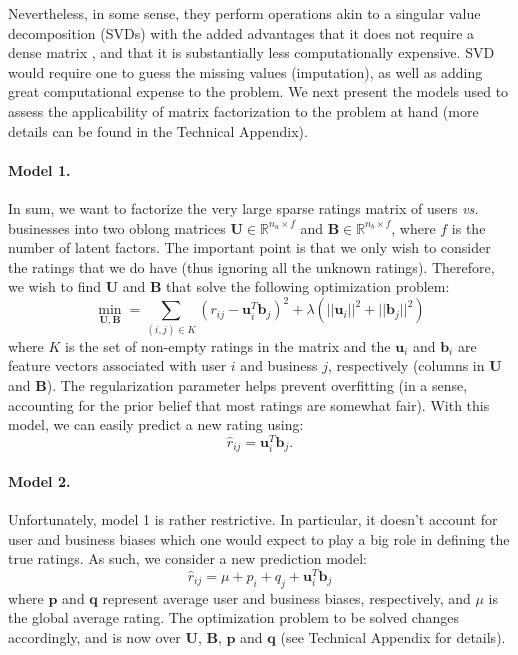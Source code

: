 \documentclass[12pt]{article}
\newcommand{\mbf}[1]{\mathbf{#1}}
\begin{document}
Nevertheless, in some sense, they perform operations akin to a singular value decomposition (SVDs) with the added advantages that it does not require a dense matrix , and that it is substantially less computationally expensive. SVD would require one to guess the missing values (imputation), as well as adding great computational expense to the problem. We next present the models used to assess the applicability of matrix factorization to the problem at hand (more details can be found in the Technical Appendix).

\paragraph{Model 1.} In sum, we want to factorize the very large sparse ratings matrix of users \emph{vs.} businesses into two oblong matrices $\mbf U\in\mathbb{R}^{n_u\times f}$ and $\mbf B\in\mathbb{R}^{n_b\times f}$, where $f$ is the number of latent factors. The important point is that we only wish to consider the ratings that we do have (thus ignoring all the unknown ratings). Therefore, we wish to find $\mbf U$ and $\mbf B$ that solve the following optimization problem:
\begin{equation}
\min_{\mbf U,\mbf B} = \sum_{(i,j)\in K} (r_{ij}-\mbf u_i^T\mbf b_j)^2+\lambda\left(||\mbf u_i||^2+||\mbf b_j||^2\right)
\end{equation}
where $K$ is the set of non-empty ratings in the matrix and the $\mbf u_i$ and $\mbf b_i$ are feature vectors associated with user $i$ and business $j$, respectively (columns in $\mbf U$ and $\mbf B$). The regularization parameter helps prevent overfitting (in a sense, accounting for the prior belief that most ratings are somewhat fair). With this model, we can easily predict a new rating using:
\begin{equation}
\hat r_{ij} = \mbf u_i^T\mbf b_j.
\end{equation}

\paragraph{Model 2.} Unfortunately, model 1 is rather restrictive. In particular, it doesn't account for user and business biases which one would expect to play a big role in defining the true ratings. As such, we consider a new prediction model:
\begin{equation}
\hat r_{ij} = \mu + p_i + q_j + \mbf u_i^T\mbf b_j
\end{equation}
where $\mbf p$ and $\mbf q$ represent average user and business biases, respectively, and $\mu$ is the global average rating. The optimization problem to be solved changes accordingly, and is now over $\mbf U$, $\mbf B$, $\mbf p$ and $\mbf q$ (see Technical Appendix for details).
\end{document}
